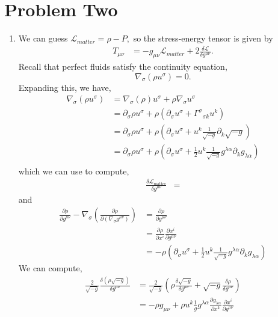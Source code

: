 \documentclass{article}
\numberwithin{equation}{section}
\begin{document}
\section{Problem Two}
\begin{enumerate}[label=(\alph*)]
    \item We can guess $\mathcal{L}_{matter}=\rho - P,$ so the stress-energy tensor is given by 
    \begin{align}
        T_{\mu\nu} &= -g_{\mu\nu}\mathcal{L}_{matter}  + 2\frac{\delta \mathcal{L}}{\delta g^{\mu\nu}}.
    \end{align}
    Recall that perfect fluids satisfy the continuity equation,
    \begin{equation}
        \nabla_\sigma(\rho u^\sigma) = 0.
    \end{equation}
    Expanding this, we have,
    \begin{align}
        \nabla_\sigma(\rho u^\sigma) &= \nabla_\sigma(\rho)u^{\sigma} + \rho \nabla_{\sigma}u^{\sigma} \\ 
        &= \partial_{\sigma}\rho u^{\sigma} + \rho \left(\partial_{\sigma} u^{\sigma} + \Gamma^{\sigma}{}_{\sigma k}u^k\right) \\ 
        &= \partial_{\sigma}\rho u^{\sigma} + \rho \left(\partial_{\sigma} u^{\sigma} + u^k\frac{1}{\sqrt{-g}}\partial_k \sqrt{-g}\right) \\ 
        &= \partial_{\sigma}\rho u^{\sigma} + \rho \left(\partial_{\sigma} u^{\sigma} + \frac{1}{2}u^k\frac{1}{\sqrt{-g}}g^{\lambda \alpha}\partial_{k}g_{\lambda\alpha}\right) \\ 
    \end{align}
    which we can use to compute,
    \begin{align}
        \frac{\delta \mathcal{L}_\text{matter}}{\delta g^{\mu\nu}} &= 
    \end{align}
    and 
    \begin{align}
        \frac{\partial \rho}{\partial g^{\mu\nu}} - \nabla_{\sigma}\left(\frac{\partial \rho}{\partial(\nabla_{\sigma}g^{\mu\nu})}\right) &= \frac{\partial\rho}{\partial g^{\mu\nu}} \\ 
        &= \frac{\partial\rho}{\partial x^i}\frac{\partial x^i}{\partial g^{\mu\nu}} \\
        &= -\rho \left(\partial_{\sigma} u^{\sigma} + \frac{1}{2}u^k\frac{1}{\sqrt{-g}}g^{\lambda \alpha}\partial_{k}g_{\lambda\alpha}\right)
    \end{align}
    We can compute,
    \begin{align}
        \frac{2}{\sqrt{-g}}\frac{\delta(\rho\sqrt{-g})}{\delta g^{\mu\nu}} &= \frac{2}{\sqrt{-g}}\left(\rho \frac{\delta\sqrt{-g}}{\delta g^{\mu\nu}} + \sqrt{-g}\frac{\delta\rho}{\delta g^{\mu\nu}}\right) \\
        &= -\rho g_{\mu\nu} + \rho u^k \frac{1}{g}g^{\lambda\alpha}\frac{\partial g_{\lambda\alpha}}{\partial x^k}\frac{\partial x^i}{\partial g^{\mu\nu}}
    \end{align}
\end{enumerate}
\end{document}
